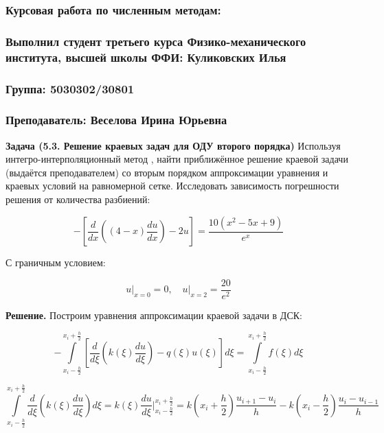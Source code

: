 \documentclass[a4paper,12pt]{article}
\begin{document}
	\begin{center}
		\subsubsection*{Курсовая работа по численным методам: }
		\subsubsection*{Выполнил студент третьего курса Физико-механического института, высшей школы ФФИ: Куликовских Илья}
		\subsubsection*{Группа: 5030302/30801}
		\subsubsection*{Преподаватель: Веселова Ирина Юрьевна}
	\end{center}
	
	\quad \textbf{Задача (5.3. Решение краевых задач для ОДУ второго порядка)} Используя интегро-интерполяционный метод , найти приближённое решение краевой задачи (выдаётся преподавателем) со вторым порядком аппроксимации уравнения и краевых условий на равномерной сетке. Исследовать зависимость погрешности решения от количества разбиений:
	
	\begin{equation}
		-\left[\dfrac{d}{dx} \left((4 - x) \dfrac{du}{dx}\right) - 2u\right] = \dfrac{10(x^2 -5x + 9)}{e^x}
	\end{equation}
	
	\quad С граничным условием: 
	
	\begin{equation}
		u \bigg|_{x=0} = 0, \quad u \bigg|_{x=2} = \dfrac{20}{e^2}
	\end{equation}
	
	\quad \textbf{Решение.} Построим уравнения аппроксимации краевой задачи в ДСК: 
	
	\begin{equation}
		-\displaystyle\int\limits_{x_i - \frac{h}{2}}^{x_i+\frac{h}{2}}  \left[\dfrac{d}{d\xi}\left(k(\xi) \dfrac{du}{d\xi}\right) -  q(\xi )u(\xi)\right]d\xi =\displaystyle\int\limits_{x_i - \frac{h}{2}}^{x_i+\frac{h}{2}} f(\xi)d\xi
	\end{equation}
	
	\begin{equation}
		\displaystyle\int\limits_{x_i - \frac{h}{2}}^{x_i+\frac{h}{2}} \dfrac{d}{d\xi}\left(k(\xi) \dfrac{du}{d\xi}\right)d\xi = k(\xi) \dfrac{du}{d\xi} \bigg|_{x_i - \frac{h}{2}}^{x_i + \frac{h}{2}} = k\left(x_i + \frac{h}{2}\right) \dfrac{u_{i+1} - u_i}{h} - k\left(x_i - \frac{h}{2}\right) \dfrac{u_i - u_{i-1}}{h}  
	\end{equation}
	
\end{document}
